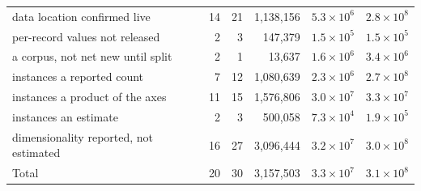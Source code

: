 \begin{table}[H]
\begin{tabular}{@{}l r r r r r@{}}
data location confirmed live & 14 & 21 & 1,138,156 & $5.3\times 10^{6}$ & $2.8\times 10^{8}$ \\
per-record values not released & 2 & 3 & 147,379 & $1.5\times 10^{5}$ & $1.5\times 10^{5}$ \\
a corpus, not net new until split & 2 & 1 & 13,637 & $1.6\times 10^{6}$ & $3.4\times 10^{6}$ \\
instances a reported count & 7 & 12 & 1,080,639 & $2.3\times 10^{6}$ & $2.7\times 10^{8}$ \\
instances a product of the axes & 11 & 15 & 1,576,806 & $3.0\times 10^{7}$ & $3.3\times 10^{7}$ \\
instances an estimate & 2 & 3 & 500,058 & $7.3\times 10^{4}$ & $1.9\times 10^{5}$ \\
dimensionality reported, not estimated & 16 & 27 & 3,096,444 & $3.2\times 10^{7}$ & $3.0\times 10^{8}$ \\
\midrule
Total & 20 & 30 & 3,157,503 & $3.3\times 10^{7}$ & $3.1\times 10^{8}$ \\
\bottomrule
\end{tabular}
\end{table}

